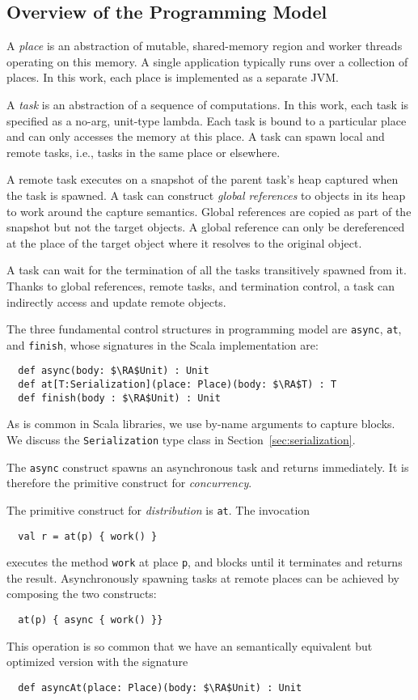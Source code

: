\subsection{Overview of the \apgas Programming Model}

A {\em place} is an abstraction of mutable, shared-memory region and worker threads operating on this memory.
A single application typically runs over a collection of places. In this work, each place is implemented as a separate JVM.

A {\em task} is an abstraction of a sequence of computations. In this work, each task is specified as a no-arg, unit-type lambda.
Each task is bound to a particular place and can only accesses the memory at this place. 
A task can spawn local and remote tasks, i.e., tasks in the same place or elsewhere.

A remote task executes on a snapshot of the parent task's heap captured when the task is spawned.
A task can construct \emph{global references} to objects in its heap to work around the capture semantics.
Global references are copied as part of the snapshot but not the target objects. A global reference can only be dereferenced
at the place of the target object where it resolves to the original object. 

A task can wait for the termination of all the tasks transitively spawned from it.
Thanks to global references, remote tasks, and termination control,
a task can indirectly access and update remote objects.

The three fundamental control structures in programming model are
\lstinline{async}, \lstinline{at}, and \lstinline{finish}, whose signatures in
the Scala implementation are:
\begin{lstlisting}
  def async(body: $\RA$Unit) : Unit
  def at[T:Serialization](place: Place)(body: $\RA$T) : T
  def finish(body : $\RA$Unit) : Unit
\end{lstlisting}
As is common in Scala libraries, we use by-name arguments to capture blocks.
We discuss the \lstinline{Serialization} type class in
Section~\ref{sec:serialization}.

The \lstinline{async} construct spawns an asynchronous task and returns
immediately. It is therefore the primitive construct for \emph{concurrency}.

The primitive construct for \emph{distribution} is \lstinline{at}. The invocation
\begin{lstlisting}
  val r = at(p) { work() }
\end{lstlisting}
executes the method \lstinline{work} at place \lstinline{p}, and blocks until
it terminates and returns the result. Asynchronously spawning tasks at remote places can be achieved by composing the two constructs:
\begin{lstlisting}
  at(p) { async { work() }}
\end{lstlisting}
This operation is so common that we have an semantically equivalent but optimized version with the signature
\begin{lstlisting}
  def asyncAt(place: Place)(body: $\RA$Unit) : Unit
\end{lstlisting}


